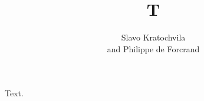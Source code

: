 \documentclass[fleqn,twoside]{article}
\begin{document}
\title{T}
\author{Slavo Kratochvila\address[ETHZ]{ETH Z\"urich}
  and Philippe de Forcrand\addressmark[ETHZ]\address[CERN]{CERN}}
\maketitle
Text.
\end{document}
